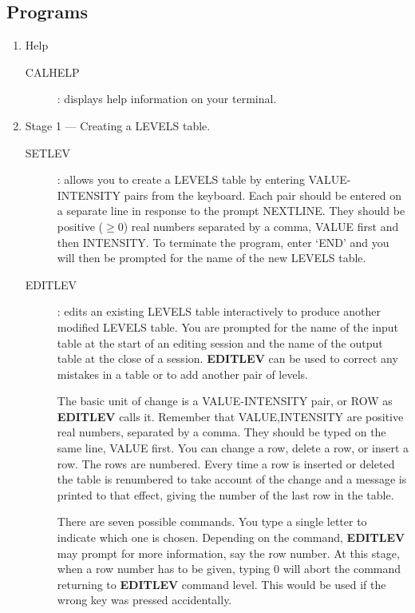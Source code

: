 \subsection {Programs}
\begin{enumerate}
\item Help
\begin{description}
\item [CALHELP]:
displays help information on your terminal.
\end{description}
\item Stage 1 --- Creating a LEVELS table.
\begin{description}
\item [SETLEV]:
allows you to create a LEVELS table by entering VALUE-INTENSITY pairs from
the keyboard.
Each pair should be entered on a separate line in response to the prompt
NEXTLINE.
They should be positive ($\geq$0) real numbers separated by a comma, VALUE first
and then INTENSITY.
To terminate the program, enter `END' and you will then be prompted for the name of
the new LEVELS table.
\item [EDITLEV]:
edits an existing LEVELS table interactively to produce another modified
LEVELS table.
You are prompted for the name of the input table at the start of an editing
session and the name of the output table at the close of a session.
{\bf EDITLEV} can be used to correct any mistakes in a table or to add another
pair of levels.

The basic unit of change is a VALUE-INTENSITY pair, or ROW as {\bf EDITLEV}
calls it.
Remember that VALUE,INTENSITY are positive real numbers, separated by a comma.
They should be typed on the same line, VALUE first.
You can change a row, delete a row, or insert a row.
The rows are numbered.
Every time a row is inserted or deleted the table is renumbered to take account
of the change and a message is printed to that effect, giving the number of the
last row in the table.

There are seven possible commands.
You type a single letter to indicate which one is chosen.
Depending on the command, {\bf EDITLEV} may prompt for more information, say
the row number.
At this stage, when a row number has to be given, typing 0 will abort the
command returning to {\bf EDITLEV} command level.
This would be used if the wrong key was pressed accidentally.


\end{description}
\end{enumerate}
